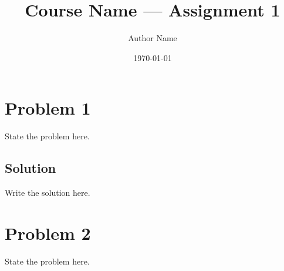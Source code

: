 \documentclass[11pt]{article}
\title{Course Name — Assignment 1}
\author{Author Name}
\date{\today}
\begin{document}
\maketitle

\section*{Problem 1}
State the problem here.

\subsection*{Solution}
Write the solution here.

\section*{Problem 2}
State the problem here.
\end{document}
